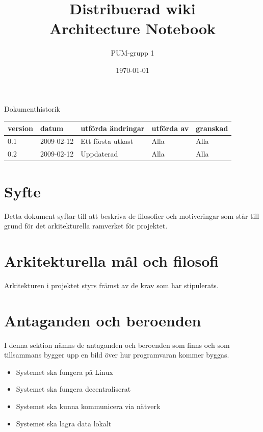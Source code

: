 

\ifpdf
\else
\fi

\title{Distribuerad wiki \\ Architecture Notebook}
\author{PUM-grupp 1}
\date{\today}



\maketitle

\thispagestyle{empty}

\newpage

{\centering \Large{Dokumenthistorik\\}}

\vspace{10pt}
\begin{tabularx}{\textwidth}{ |l|l|X|l|l| }
  \hline
    \textbf{version} & \textbf{datum} & \textbf{utförda ändringar} & \textbf{utförda av} & \textbf{granskad} \\
	\hline 
  0.1 & 2009-02-12 &  Ett första utkast  & Alla & Alla   \\
	\hline 
  0.2 & 2009-02-12 &  Uppdaterad  & Alla & Alla   \\
  \hline
\end{tabularx}

\newpage

\setcounter{tocdepth}{2}
\tableofcontents
\newpage

\section{Syfte}
Detta dokument syftar till att beskriva de filosofier och motiveringar som står till grund för det arkitekturella ramverket för projektet.
\section{Arkitekturella mål och filosofi}
Arkitekturen i projektet styrs främst av de krav som har stipulerats.
\section{Antaganden och beroenden}
I denna sektion nämns de antaganden och beroenden som finns och som tillsammans bygger upp en bild över hur programvaran kommer byggas.
\begin{itemize}
\item Systemet ska fungera på Linux
\item Systemet ska fungera decentraliserat
\item Systemet ska kunna kommunicera via nätverk
\item Systemet ska lagra data lokalt
\end{itemize}
